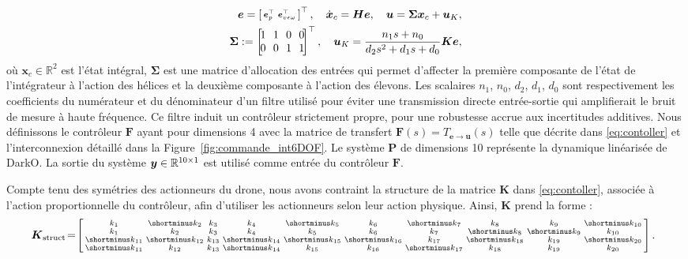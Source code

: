 \begin{subequations}
    \label{eq:contoller}
    \begin{align}
        \boldsymbol{e} = \smallmat{
        \boldsymbol{e}_{p}^\top & \boldsymbol{e}_{v\epsilon\omega}^\top}^\top, \quad \dot{\boldsymbol{x}}_{c} = \boldsymbol{H} \boldsymbol{e}, \quad    \boldsymbol{u} = \boldsymbol{\Sigma} \boldsymbol{x}_{c} + \boldsymbol{u}_{K},
        \\
        \boldsymbol{\Sigma} := \begin{bmatrix} \! 1 \!&\! 1\! & \!0\! &\! 0\!\\ \!0\! & \!0\! & \!1 \!& \!1\!\end{bmatrix}^\top, \quad
        \boldsymbol{u}_{K} = \frac{n_1 s+n_0}{d_2 s^{2}+d_1 s + d_0}\boldsymbol{K} \boldsymbol{e} ,
    \end{align}
\end{subequations}
où $\boldsymbol{x}_{c} \in \mathbb{R}^{2}$ est l'état intégral, $\boldsymbol{\Sigma}$ est une matrice d'allocation des entrées qui permet d'affecter la première composante de l'état de l'intégrateur à l'action des hélices et la deuxième composante à l'action des élevons. Les scalaires $n_1$, $n_0$,  $d_2$,  $d_1$,  $d_0$ sont respectivement les coefficients du numérateur et du dénominateur d'un filtre utilisé pour éviter une transmission directe entrée-sortie qui amplifierait le bruit de mesure à haute fréquence. Ce filtre induit un contrôleur strictement propre, pour une robustesse accrue aux incertitudes additives. Nous définissons le contrôleur $\boldsymbol{F}$ ayant pour dimensions 4 avec la matrice de transfert $\boldsymbol{F}(s) = T_{\boldsymbol{e} \rightarrow \boldsymbol{u}}(s)$ telle que décrite dans \eqref{eq:contoller} et l'interconnexion détaillé dans la Figure~\ref{fig:commande_int6DOF}. Le système $\boldsymbol{P}$ de dimensions 10 représente la dynamique linéarisée de DarkO. La sortie du système $\boldsymbol{y} \in {\mathbb R}^{10\times1}$ est utilisé comme entrée du contrôleur $\boldsymbol{F}$.

Compte tenu des symétries des actionneurs du drone, nous avons contraint la structure de la matrice $\boldsymbol{K}$ dans \eqref{eq:contoller}, associée à l'action proportionnelle du contrôleur, afin d'utiliser les actionneurs selon leur action physique. Ainsi, $\boldsymbol{K}$ prend la forme : 
\begin{align}
\label{eq:k_struct}
    \!\!\!\boldsymbol{K}_{\text{struct}} \!=\!  \smallmat{
             k_{1}& \shortminus k_{2}& k_{3}&  k_{4}& \shortminus k_{5}&  k_{6}& \shortminus k_{7}&  k_{8}&  k_{9}& \shortminus k_{10}\\
             k_{1}&  k_{2}& k_{3}&  k_{4}&  k_{5}&  k_{6}&   k_{7}& \shortminus k_{8}& \shortminus k_{9}&  k_{10}\\
            \shortminus k_{11}& \shortminus k_{12}& k_{13}& \shortminus k_{14}& \shortminus k_{15}& \shortminus k_{16}&   k_{17}& \shortminus k_{18}&  k_{19}& \shortminus k_{20}\\
            \shortminus k_{11}&  k_{12}& k_{13}& \shortminus k_{14}&  k_{15}&  k_{16}&   \shortminus k_{17}&  k_{18}&  k_{19}&  k_{20} 
         }.
\end{align}

